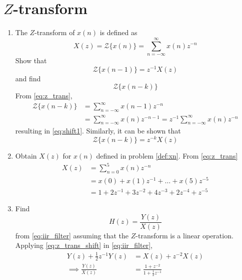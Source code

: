 \documentclass[journal,12pt,twocolumn]{IEEEtran}
\renewcommand\thesection{\arabic{section}}
\begin{document}
\section{$Z$-transform}
\begin{enumerate}[label=\thesection.\arabic*]
\item The $Z$-transform of $x(n)$ is defined as
%
\begin{equation}
\label{eq:z_trans}
X(z)={\mathcal {Z}}\{x(n)\}=\sum _{n=-\infty }^{\infty }x(n)z^{-n}
\end{equation}
%
Show that
\begin{equation}
\label{eq:shift1}
{\mathcal {Z}}\{x(n-1)\} = z^{-1}X(z)
\end{equation}
and find
\begin{equation}
	{\mathcal {Z}}\{x(n-k)\} 
\end{equation}
\solution From \eqref{eq:z_trans},
\begin{align}
{\mathcal {Z}}\{x(n-k)\} &=\sum _{n=-\infty }^{\infty }x(n-1)z^{-n}
\\
&=\sum _{n=-\infty }^{\infty }x(n)z^{-n-1} = z^{-1}\sum _{n=-\infty }^{\infty }x(n)z^{-n}
\end{align}
resulting in \eqref{eq:shift1}. Similarly, it can be shown that
%
\begin{equation}
\label{eq:z_trans_shift}
	{\mathcal {Z}}\{x(n-k)\} = z^{-k}X(z)
\end{equation}
\item Obtain $X(z)$ for $x(n)$ defined in problem 
	\ref{def:xn}.
\solution From \eqref{eq:z_trans}
\begin{align}
    X(z) &= \sum _{n=0 }^{5}x(n)z^{-n}\\
    &= x(0) + x(1)z^{-1} + \dots + x(5)z^{-5}\\
    &= 1 + 2z^{-1} + 3z^{-2} + 4z^{-3} + 2z^{-4} + z^{-5}
\end{align}
\item Find
%
\begin{equation}
H(z) = \frac{Y(z)}{X(z)}
\end{equation}
%
from  \eqref{eq:iir_filter} assuming that the $Z$-transform is a linear operation.
\\
\solution  Applying \eqref{eq:z_trans_shift} in \eqref{eq:iir_filter},
\begin{align}
Y(z) + \frac{1}{2}z^{-1}Y(z) &= X(z)+z^{-2}X(z)
\\
\implies \frac{Y(z)}{X(z)} &= \frac{1 + z^{-2}}{1 + \frac{1}{2}z^{-1}}
\label{eq:freq_resp}
\end{align}

\end{enumerate}
\end{document}

